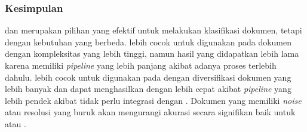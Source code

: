 \subsubsection{Kesimpulan}

\layoutlm{} dan \donut{} merupakan pilihan yang efektif untuk melakukan klasifikasi dokumen, tetapi dengan kebutuhan yang berbeda. \layoutlm{} lebih 
cocok untuk digunakan pada dokumen dengan kompleksitas yang lebih tinggi, namun hasil yang didapatkan lebih lama karena memiliki \textit{pipeline} yang lebih 
panjang akibat adanya proses \ocr{} terlebih dahulu. \donut{} lebih cocok untuk digunakan pada \dataset{} dengan diversifikasi dokumen yang lebih banyak dan dapat menghasilkan dengan lebih cepat akibat \emph{pipeline} yang lebih pendek akibat tidak perlu integrasi dengan \ocr. Dokumen yang memiliki \textit{noise} atau resolusi yang buruk akan mengurangi akurasi secara signifikan baik untuk \layoutlm{} atau \donut.